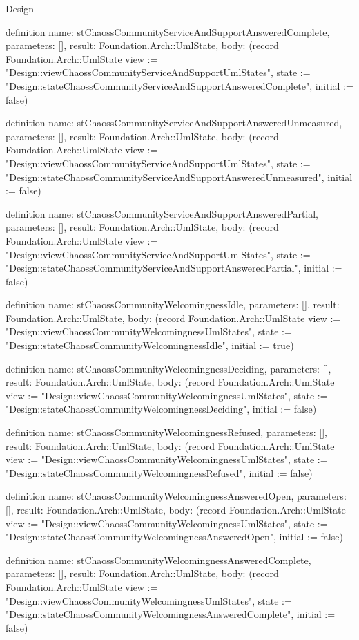 \begin{lexlean}{Design}
\begin{semanticmodule}
definition{
  name: stChaossCommunityServiceAndSupportAnsweredComplete,
  parameters: [],
  result: Foundation.Arch::UmlState,
  body: (record Foundation.Arch::UmlState {view := "Design::viewChaossCommunityServiceAndSupportUmlStates", state := "Design::stateChaossCommunityServiceAndSupportAnsweredComplete", initial := false})
}

definition{
  name: stChaossCommunityServiceAndSupportAnsweredUnmeasured,
  parameters: [],
  result: Foundation.Arch::UmlState,
  body: (record Foundation.Arch::UmlState {view := "Design::viewChaossCommunityServiceAndSupportUmlStates", state := "Design::stateChaossCommunityServiceAndSupportAnsweredUnmeasured", initial := false})
}

definition{
  name: stChaossCommunityServiceAndSupportAnsweredPartial,
  parameters: [],
  result: Foundation.Arch::UmlState,
  body: (record Foundation.Arch::UmlState {view := "Design::viewChaossCommunityServiceAndSupportUmlStates", state := "Design::stateChaossCommunityServiceAndSupportAnsweredPartial", initial := false})
}

definition{
  name: stChaossCommunityWelcomingnessIdle,
  parameters: [],
  result: Foundation.Arch::UmlState,
  body: (record Foundation.Arch::UmlState {view := "Design::viewChaossCommunityWelcomingnessUmlStates", state := "Design::stateChaossCommunityWelcomingnessIdle", initial := true})
}

definition{
  name: stChaossCommunityWelcomingnessDeciding,
  parameters: [],
  result: Foundation.Arch::UmlState,
  body: (record Foundation.Arch::UmlState {view := "Design::viewChaossCommunityWelcomingnessUmlStates", state := "Design::stateChaossCommunityWelcomingnessDeciding", initial := false})
}

definition{
  name: stChaossCommunityWelcomingnessRefused,
  parameters: [],
  result: Foundation.Arch::UmlState,
  body: (record Foundation.Arch::UmlState {view := "Design::viewChaossCommunityWelcomingnessUmlStates", state := "Design::stateChaossCommunityWelcomingnessRefused", initial := false})
}

definition{
  name: stChaossCommunityWelcomingnessAnsweredOpen,
  parameters: [],
  result: Foundation.Arch::UmlState,
  body: (record Foundation.Arch::UmlState {view := "Design::viewChaossCommunityWelcomingnessUmlStates", state := "Design::stateChaossCommunityWelcomingnessAnsweredOpen", initial := false})
}

definition{
  name: stChaossCommunityWelcomingnessAnsweredComplete,
  parameters: [],
  result: Foundation.Arch::UmlState,
  body: (record Foundation.Arch::UmlState {view := "Design::viewChaossCommunityWelcomingnessUmlStates", state := "Design::stateChaossCommunityWelcomingnessAnsweredComplete", initial := false})
}


\end{semanticmodule}
\end{lexlean}

